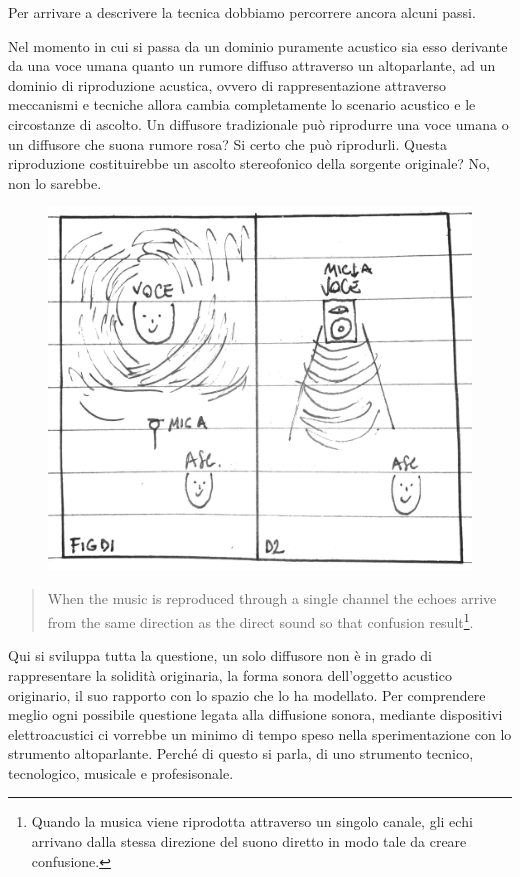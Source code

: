 Per arrivare a descrivere la tecnica dobbiamo percorrere ancora alcuni passi.

Nel momento in cui si passa da un dominio puramente acustico sia esso derivante
da una voce umana quanto un rumore diffuso attraverso un altoparlante, ad un
dominio di riproduzione acustica, ovvero di rappresentazione attraverso meccanismi
e tecniche allora cambia completamente lo scenario acustico e le circostanze di
ascolto. Un diffusore tradizionale può riprodurre una voce umana o un diffusore
che suona rumore rosa? Si certo che può riprodurli. Questa riproduzione
costituirebbe un ascolto stereofonico della sorgente originale? No, non lo sarebbe.

\begin{figure}[h]
\begin{center}
  \includegraphics[width=.98\linewidth]{CAPITOLI/1000/IMG/figd1d2.png}
\label{ee:figa}
\end{center}
\end{figure}


\begin{quote}
When the music is reproduced through a single channel the echoes arrive from the same direction as the direct sound so that confusion result\footnote{Quando la musica viene riprodotta attraverso un singolo canale, gli echi arrivano dalla stessa direzione del suono diretto in modo tale da creare confusione.}.
\end{quote}

Qui si sviluppa tutta la questione, un solo diffusore non è in grado di rappresentare
la solidità originaria, la forma sonora dell'oggetto acustico originario, il suo
rapporto con lo spazio che lo ha modellato. Per comprendere meglio ogni possibile
questione legata alla diffusione sonora, mediante dispositivi elettroacustici ci
vorrebbe un minimo di tempo speso nella sperimentazione con lo strumento altoparlante.
Perché di questo si parla, di uno strumento tecnico, tecnologico, musicale e
profesisonale.

